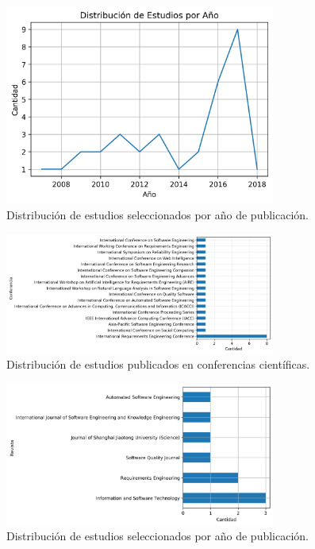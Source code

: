 \documentclass[journal]{IEEEtran}
\begin{document}
\begin{figure}[!t]
\centering
\includegraphics[width=3.5in]{figures/Figure5_Guada.png}
\caption{Distribuci\'on de estudios seleccionados por año de publicaci\'on.}
\label{fig:5}
\end{figure}


\begin{figure}[!t]
\centering
\includegraphics[width=3.5in]{figures/Figure6_Guada.png}
\caption{Distribuci\'on de estudios publicados en conferencias cient\'ificas.}
\label{fig:6}
\end{figure}

\begin{figure}[!t]
\centering
\includegraphics[width=3.5in]{figures/Figure7_Guada.png}
\caption{Distribuci\'on de estudios seleccionados por año de publicaci\'on.}
\label{fig:7}
\end{figure}
\end{document}
